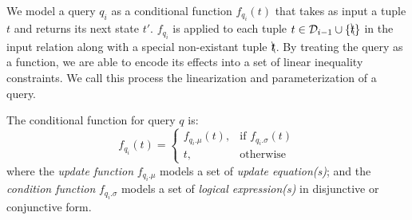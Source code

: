 We model a query $q_i$ as a conditional function $f_{q_i}(t)$ that takes as input a tuple $t$
and returns its next state $t'$.  $f_{q_i}$ is applied to each 
tuple $t \in \mathcal{D}_{i-1} \cup \{\bcancel{t}\}$ in the input relation along with a special
non-existant tuple $\bcancel{t}$. 
By treating the query as a function, we are able to encode its effects into a set
of linear inequality constraints.  We call this process the linearization and 
parameterization of a query.

\begin{definition} 
\label{def:cond}
	The conditional function for query $q$ is:
	\[
    f_{q_i}(t)= 
    \begin{cases}
    f_{q_i.\mu} (t) ,& \text{if } f_{q_i.\sigma} (t)\\
    t,              & \text{otherwise}
    \end{cases}
\]
where the \textit{update function} $f_{q_i.\mu}$ models a set of \textit{update equation(s)};
and the \textit{condition function} $f_{q_i.\sigma}$ models a set of \textit{logical expression(s)} in 
disjunctive or conjunctive form.
\end{definition} 



